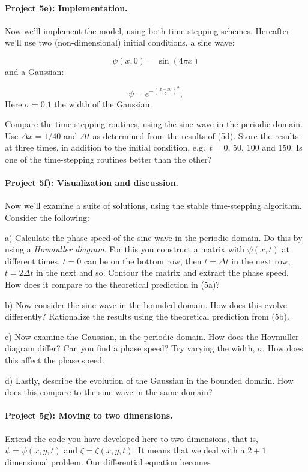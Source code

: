 \documentclass[%
oneside,                 %
final,                   %
10pt]{article}
\begin{document}
\paragraph{Project 5e): Implementation.}
Now we'll implement the model, using both time-stepping schemes.
Hereafter we'll use two (non-dimensional) initial
conditions, a sine wave:

\begin{equation}
\psi(x,0) = \sin\left( 4\pi x \right)
\end{equation}
and a Gaussian:

\begin{equation}
\psi = e^{-\left(\frac{x-x0}{\sigma}\right)^2},
\end{equation}
Here $\sigma = 0.1$ the width of the Gaussian.

Compare the time-stepping routines, using the sine wave in the
periodic domain. Use $\Delta x=1/40$ and $\Delta t$ as determined from the
results of (5d). Store the results at three times, in addition to the
initial condition, e.g.~$t=$0, 50, 100 and 150.  Is one of the
time-stepping routines better than the other?


\paragraph{Project 5f): Visualization and discussion.}
Now we'll examine a suite of solutions, using the stable time-stepping
algorithm. Consider the following:

a) Calculate the phase speed of the sine wave in the periodic domain.
Do this by using a \emph{Hovmuller diagram}.  For this you construct a
matrix with $\psi(x,t)$ at different times. $t=0$ can be on the bottom
row, then $t=\Delta t$ in the next row, $t=2\Delta t$ in the next and
so. Contour the matrix and extract the phase speed. How does it
compare to the theoretical prediction in (5a)?

b) Now consider the sine wave in the bounded domain. How does this
evolve differently? Rationalize the results using the theoretical
prediction from (5b).

c) Now examine the Gaussian, in the periodic domain. How does the
Hovmuller diagram differ? Can you find a phase speed? Try varying
the width, $\sigma$. How does this affect the phase speed.

d) Lastly, describe the evolution of the Gaussian in the bounded
domain. How does this compare to the sine wave in the same domain?


\paragraph{Project 5g): Moving to two dimensions.}
Extend the code you have developed here to two dimensions, that is,
$\psi = \psi(x,y,t)$ and $\zeta = \zeta(x,y,t)$. It means that we deal
with a $2+1$ dimensional problem. Our differential equation becomes
\end{document}
